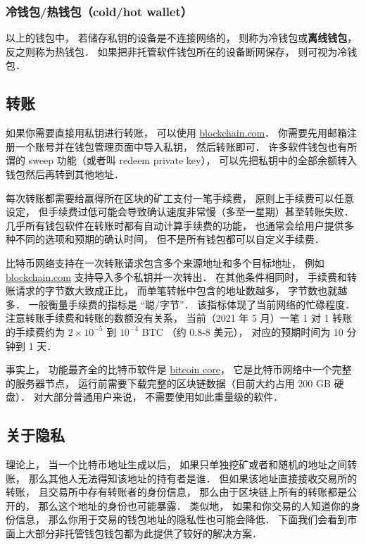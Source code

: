 \subsubsection{冷钱包/热钱包（cold/hot wallet）}
以上的钱包中， 若储存私钥的设备是不连接网络的， 则称为冷钱包或\textbf{离线钱包}， 反之则称为热钱包． 如果把非托管软件钱包所在的设备断网保存， 则可视为冷钱包．


\subsection{转账}
如果你需要直接用私钥进行转账， 可以使用 \href{https://blockchain.com}{blockchain.com}． 你需要先用邮箱注册一个账号并在钱包管理页面中导入私钥， 然后转账即可． 许多软件钱包也有所谓的 sweep 功能（或者叫 redeem private key）， 可以先把私钥中的全部余额转入钱包然后再转到其他地址．

每次转账都需要给赢得所在区块的矿工支付一笔手续费， 原则上手续费可以任意设定， 但手续费过低可能会导致确认速度非常慢（多至一星期）甚至转账失败． 几乎所有钱包软件在转账时都有自动计算手续费的功能， 也通常会给用户提供多种不同的选项和预期的确认时间， 但不是所有钱包都可以自定义手续费．

比特币网络支持在一次转账请求包含多个来源地址和多个目标地址， 例如 \href{https://blockchain.com}{blockchain.com} 支持导入多个私钥并一次转出． 在其他条件相同时， 手续费和转账请求的字节数大致成正比， 而单笔转帐中包含的地址数越多， 字节数也就越多． 一般衡量手续费的指标是 “聪/字节”． 该指标体现了当前网络的忙碌程度． 注意转账手续费和转账的数额没有关系， 当前（2021 年 5 月）一笔 1 对 1 转账的手续费约为 $2\times 10^{-5}$ 到 $10^{-4}$ BTC （约 0.8-8 美元）， 对应的预期时间为 10 分钟到 1 天．

事实上， 功能最齐全的比特币软件是 \href{https://bitcoin.org/en/bitcoin-core/}{bitcoin core}， 它是比特币网络中一个完整的服务器节点， 运行前需要下载完整的区块链数据（目前大约占用 200 GB 硬盘）． 对大部分普通用户来说， 不需要使用如此重量级的软件．

\subsection{关于隐私}
理论上， 当一个比特币地址生成以后， 如果只单独挖矿或者和随机的地址之间转账， 那么其他人无法得知该地址的持有者是谁． 但如果该地址直接接收交易所的转账， 且交易所中存有转账者的身份信息， 那么由于区块链上所有的转账都是公开的， 那么这个地址的身份也可能暴露． 类似地， 如果和你交易的人知道你的身份信息， 那么你用于交易的钱包地址的隐私性也可能会降低． 下面我们会看到市面上大部分非托管钱包钱包都为此提供了较好的解决方案．

